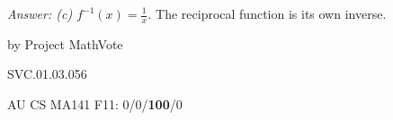 
{\it Answer:  (c) $\displaystyle f^{-1}(x)=\frac{1}{x}$.}  The reciprocal function is its own inverse.

\medskip
by Project MathVote

SVC.01.03.056

AU CS MA141 F11: 0/0/{\bf 100}/0 \\
